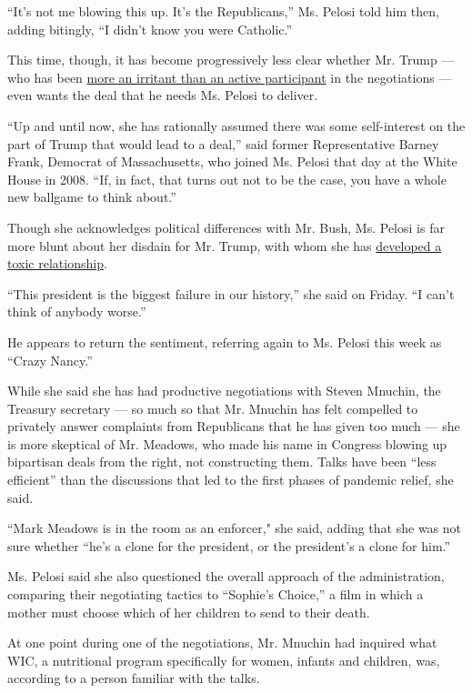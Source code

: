 ``It's not me blowing this up. It's the Republicans,'' Ms. Pelosi told
him then, adding bitingly, ``I didn't know you were Catholic.''

This time, though, it has become progressively less clear whether Mr.
Trump --- who has been
\href{https://www.nytimes.com/2020/08/03/us/politics/congress-jobless-aid-talks-trump.html}{more
an irritant than an active participant} in the negotiations --- even
wants the deal that he needs Ms. Pelosi to deliver.

``Up and until now, she has rationally assumed there was some
self-interest on the part of Trump that would lead to a deal,'' said
former Representative Barney Frank, Democrat of Massachusetts, who
joined Ms. Pelosi that day at the White House in 2008. ``If, in fact,
that turns out not to be the case, you have a whole new ballgame to
think about.''

Though she acknowledges political differences with Mr. Bush, Ms. Pelosi
is far more blunt about her disdain for Mr. Trump, with whom she has
\href{https://www.nytimes.com/2019/10/18/us/politics/trump-pelosi-photo.html}{developed
a toxic relationship}.

``This president is the biggest failure in our history,'' she said on
Friday. ``I can't think of anybody worse.''

He appears to return the sentiment, referring again to Ms. Pelosi this
week as ``Crazy Nancy.''

While she said she has had productive negotiations with Steven Mnuchin,
the Treasury secretary --- so much so that Mr. Mnuchin has felt
compelled to privately answer complaints from Republicans that he has
given too much --- she is more skeptical of Mr. Meadows, who made his
name in Congress blowing up bipartisan deals from the right, not
constructing them. Talks have been ``less efficient'' than the
discussions that led to the first phases of pandemic relief, she said.

``Mark Meadows is in the room as an enforcer," she said, adding that she
was not sure whether ``he's a clone for the president, or the
president's a clone for him.''

Ms. Pelosi said she also questioned the overall approach of the
administration, comparing their negotiating tactics to ``Sophie's
Choice,'' a film in which a mother must choose which of her children to
send to their death.

At one point during one of the negotiations, Mr. Mnuchin had inquired
what WIC, a nutritional program specifically for women, infants and
children, was, according to a person familiar with the talks.


